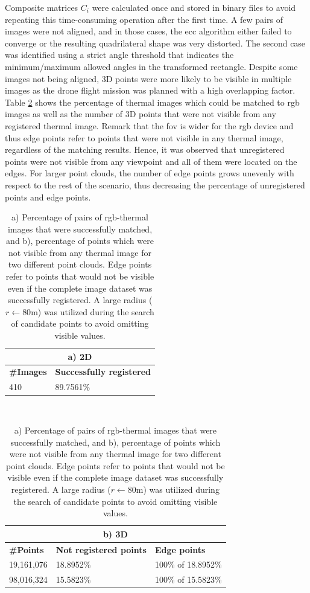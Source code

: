 Composite matrices $C_i$ were calculated once and stored in binary files to avoid repeating this time-consuming operation after the first time. A few pairs of images were not aligned, and in those cases, the \acrshort{ecc} algorithm either failed to converge or the resulting quadrilateral shape was very distorted. The second case was identified using a strict angle threshold that indicates the minimum/maximum allowed angles in the transformed rectangle. Despite some images not being aligned, 3D points were more likely to be visible in multiple images as the drone flight mission was planned with a high overlapping factor. Table \ref{table:image_registration_statistics} shows the percentage of thermal images which could be matched to \acrshort{rgb} images as well as the number of 3D points that were not visible from any registered thermal image. Remark that the \acrshort{fov} is wider for the \acrshort{rgb} device and thus edge points refer to points that were not visible in any thermal image, regardless of the matching results. Hence, it was observed that unregistered points were not visible from any viewpoint and all of them were located on the edges. For larger point clouds, the number of edge points grows unevenly with respect to the rest of the scenario, thus decreasing the percentage of unregistered points and edge points.

\begin{table}
    \sffamily
    \caption{a) Percentage of pairs of \acrshort{rgb}-thermal images that were successfully matched, and b), percentage of points which were not visible from any thermal image for two different point clouds. Edge points refer to points that would not be visible even if the complete image dataset was successfully registered. A large radius ($r \gets 80$\si{\meter}) was utilized during the search of candidate points to avoid omitting visible values.}
    \label{table:image_registration_statistics}
    \begin{tabular}{l@{\hskip 0.3in}l@{}}
        \multicolumn{2}{c}{a) 2D}\\
        \midrule
        \textbf{\#Images} & \textbf{Successfully registered}\\
        \midrule
        410 & 89.7561\% \\
        \bottomrule
    \end{tabular}\\[2mm]
    \begin{tabular}{l@{\hskip 0.3in}l@{\hskip 0.3in}l@{}}
        \multicolumn{3}{c}{b) 3D}\\
        \midrule
        \textbf{\#Points} & \textbf{Not registered points} & \textbf{Edge points}\\
        \midrule
        19,161,076 & 18.8952\% & 100\% of 18.8952\%\\
        98,016,324 & 15.5823\% & 100\% of 15.5823\%\\
        \bottomrule
    \end{tabular}
\end{table}

